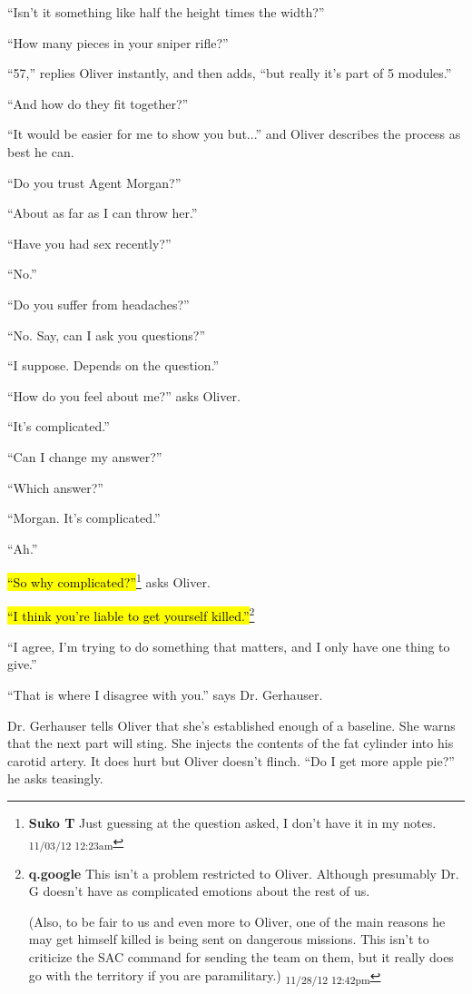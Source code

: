 ``Isn't it something like half the height times the width?''

``How many pieces in your sniper rifle?''

``57,'' replies Oliver instantly, and then adds, ``but really it's part of 5 modules.''

``And how do they fit together?''

``It would be easier for me to show you but...'' and Oliver describes the process as best he can.

``Do you trust Agent Morgan?''

``About as far as I can throw her.''

``Have you had sex recently?''

``No.''

``Do you suffer from headaches?''

``No.  Say, can I ask you questions?''

``I suppose.  Depends on the question.''

``How do you feel about me?'' asks Oliver.

``It's complicated.''

``Can I change my answer?''

``Which answer?''

``Morgan.  It's complicated.''

``Ah.''

\hl{``So why complicated?''}\footnote{\textbf{Suko T }Just guessing at the question asked, I don't have it in my notes. \textsubscript{11/03/12 12:23am}} asks Oliver.

\hl{``I think you're liable to get yourself killed.''}\footnote{\textbf{q.google }This isn't a problem restricted to Oliver.  Although presumably Dr. G doesn't have as complicated emotions about the rest of us.

(Also, to be fair to us and even more to Oliver, one of the main reasons he may get himself killed is being sent on dangerous missions.  This isn't to criticize the SAC command for sending the team on them, but it really does go with the territory if you are paramilitary.) \textsubscript{11/28/12 12:42pm}}

``I agree, I'm trying to do something that matters, and I only have one thing to give.''

``That is where I disagree with you.'' says Dr. Gerhauser.



Dr. Gerhauser tells Oliver that she's established enough of a baseline.  She warns that the next part will sting.  She injects the contents of the fat cylinder into his carotid artery. It does hurt but Oliver doesn't flinch.  ``Do I get more apple pie?'' he asks teasingly.

